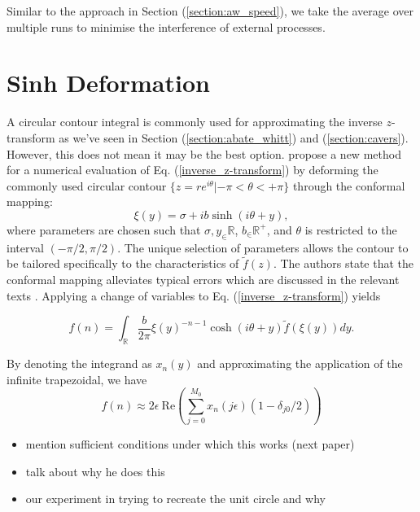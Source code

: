 \documentclass[a4paper]{report}
\begin{document}
Similar to the approach in Section (\ref{section:aw_speed}), we take the average over multiple runs to minimise the interference of external processes.

\section{Sinh Deformation}\label{section:sinh_deformation}
A circular contour integral is commonly used for approximating the inverse $z$-transform as we've seen in Section (\ref{section:abate_whitt}) and (\ref{section:cavers}). However, this does not mean it may be the best option. \citet{levendorskii2022sinh} propose a new method for a numerical evaluation of Eq. (\ref{inverse_z-transform}) by deforming the commonly used circular contour $\{z = re^{i\theta} | -\pi < \theta < +\pi\}$ through the conformal mapping:
\begin{equation}\label{equation:conformal_mapping}
    \xi(y) = \sigma + ib\sinh(i\theta + y),
\end{equation}
where parameters are chosen such that $\sigma,y_\in \mathbb{R}$, $b_\in \mathbb{R}^+$, and $\theta$ is restricted to the interval $(-\pi/2, \pi / 2)$. The unique selection of parameters allows the contour to be tailored specifically to the characteristics of $\tilde{f}(z)$. The authors state that the conformal mapping alleviates typical errors which are discussed in the relevant texts \citep{boyarchenko2014efficient, boyarchenko2019sinh, schmelzer2007computing}.  Applying a change of variables to Eq. (\ref{inverse_z-transform}) yields

\begin{equation}
    f(n) = \int_\mathbb{R} \frac{b}{2\pi} \xi(y)^{-n-1} \cosh(i\theta + y) \tilde{f}(\xi(y)) dy.
\end{equation}

By denoting the integrand as $x_n(y)$ and approximating the application of the infinite trapezoidal, we have 
\begin{equation}
    f(n) \approx 2 \epsilon\ \text{Re}\left( \sum_{j = 0}^{M_0} x_n(j \epsilon)(1 - \delta_{j0}/2) \right)
\end{equation}


\begin{itemize}
    \item mention sufficient conditions under which this works (next paper)
    \item talk about why he does this
    \item our experiment in trying to recreate the unit circle and why
\end{itemize}
\end{document}
